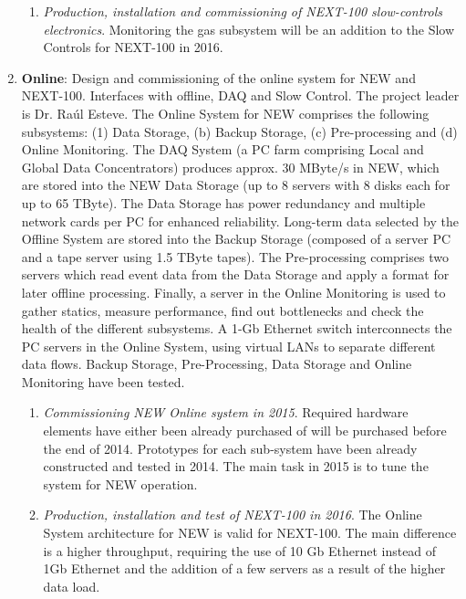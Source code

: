 \begin{enumerate}
\begin{enumerate}
\item {\em Production, installation and commissioning of NEXT-100 slow-controls electronics}. Monitoring the gas subsystem will be an addition to the Slow Controls for NEXT-100 in 2016.
\end{enumerate}

\item {\bf Online}: Design and commissioning of the online system for NEW and NEXT-100. Interfaces with offline, DAQ and Slow Control. The project leader is Dr. Raúl Esteve. The Online System for NEW comprises the following subsystems: (1) Data Storage, (b) Backup Storage, (c) Pre-processing and (d) Online Monitoring. The DAQ System (a PC farm comprising Local and Global Data Concentrators) produces approx. 30 MByte/s in NEW, which are stored into the NEW Data Storage (up to 8 servers with 8 disks each for up to 65 TByte). The Data Storage has power redundancy and multiple network cards per PC for enhanced reliability. Long-term data selected by the Offline System are stored into the Backup Storage (composed of a server PC and a tape server using 1.5 TByte tapes). The Pre-processing comprises two servers which read event data from the Data Storage and apply a format for later offline processing. Finally, a server in the Online Monitoring is used to gather statics, measure performance, find out bottlenecks and check the health of the different subsystems. A 1-Gb Ethernet switch interconnects the PC servers in the Online System, using virtual LANs to separate different data flows.
Backup Storage, Pre-Processing, Data Storage and Online Monitoring have been tested.
\begin{enumerate}
\item {\em Commissioning NEW Online system in 2015}. Required hardware elements have either been already purchased of will be purchased before the end of 2014. Prototypes for each sub-system have been already constructed and tested in 2014. The main task in 2015 is to tune the system for NEW operation.
\item {\em Production, installation and test of NEXT-100 in 2016}. The Online System architecture for NEW is valid for NEXT-100. The main difference is a higher throughput, requiring the use of 10 Gb Ethernet instead of 1Gb Ethernet and the addition of a few servers as a result of the higher data load.
\end{enumerate}

\end{enumerate}

